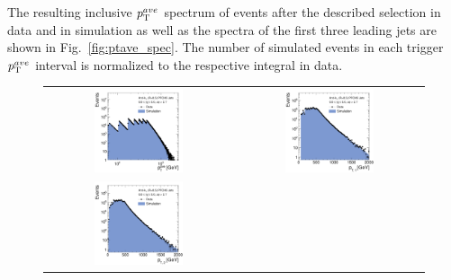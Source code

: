 The resulting inclusive $p_{\text{T}}^{ave}$ spectrum of events after the described selection in data and in simulation as well as the \pt spectra of the first three leading jets are shown in Fig.~\ref{fig:ptave_spec}. The number of simulated events in each trigger $p_{\text{T}}^{ave}$ interval is normalized to the respective integral in data. 
\begin{figure}[!tp]
  \centering
  \begin{tabular}{cc}
                \includegraphics[width=0.49\textwidth]{figures/PtAve__AfterAsymmHistos.pdf} &
                \includegraphics[width=0.49\textwidth]{figures/Jet1Pt__AfterAsymmHistos.pdf} \\
                \includegraphics[width=0.49\textwidth]{figures/Jet2Pt__AfterAsymmHistos.pdf} &

\end{tabular}
\end{figure}
